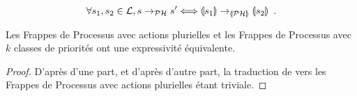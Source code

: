 \begin{theorem}[$\PH \approx \phmtophp$]
  \[\forall s_1, s_2 \in \mathcal{L}, s \rightarrow_{\mathcal{PH}} s' \Longleftrightarrow
    \llparenthesis s_1 \rrparenthesis \rightarrow_{\llparenthesis \mathcal{PH} \rrparenthesis} \llparenthesis s_2 \rrparenthesis \enspace.\]
\end{theorem}


\begin{theorem}[Équivalence]
  Les Frappes de Processus avec actions plurielles
  et les Frappes de Processus avec $k$ classes de priorités
  ont une expressivité équivalente.
\end{theorem}

\begin{proof}
  D'après  d'une part,
  et d'après  d'autre part,
  la traduction de  vers les Frappes de Processus avec actions plurielles
  étant triviale.
\end{proof}





